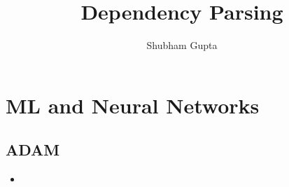 \documentclass[a4paper]{article}
\title{Dependency Parsing}
\author{Shubham Gupta}
\begin{document}
\maketitle
\section{ML and Neural Networks}
\subsection{ADAM}
\begin{itemize}
    \item
\end{itemize}
\end{document}

